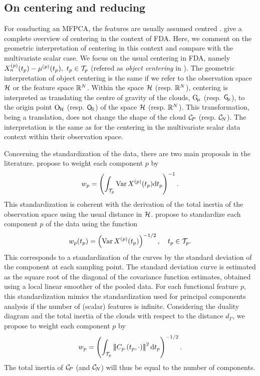 \subsection{On centering and reducing} %
\label{sub:on_centering_and_reducing}

For conducting an MFPCA, the features are usually assumed centred \citep{happMultivariateFunctionalPrincipal2018a}. \cite{protheroNewPerspectivesCentering2023} give a complete overview of centering in the context of FDA. Here, we comment on the geometric interpretation of centering in this context and compare with the multivariate scalar case. We focus on the usual centering in FDA, namely $X_n^{(p)}(t_p) - \mu^{(p)}(t_p),~t_p \in \mathcal{T}_{p}$ (refered as \emph{object centering} in \cite{protheroNewPerspectivesCentering2023}).
The geometric interpretation of object centering is the same if we refer to the observation space $\mathcal{H}$ or the feature space $\mathbb{R}^N$. Within the space $\mathcal{H}$ (resp. $\mathbb{R}^N$), centering is interpreted as translating the centre of gravity of the clouds, $\mathrm{G}_{\!\mu}$ (resp. $\mathsf{G}_{\!\mu}$), to the origin point $\mathrm{O}_{\!\mathcal{H}}$ (resp. $\mathsf{O}_{\!\mathbb{R}}$) of the space $\mathcal{H}$ (resp. $\mathbb{R}^N$). This transformation, being a translation, does not change the shape of the cloud $\mathcal{C}_{\!P}$ (resp. $\mathcal{C}_{\!N}$). The interpretation is the same as for the centering in the multivariate scalar data context within their observation space.

Concerning the standardization of the data, there are two main proposals in the literature. \cite{happMultivariateFunctionalPrincipal2018a} propose to weight each component $p$ by
\begin{equation}
w_p = \left(\int_{\mathcal{T}_{p}} \operatorname{Var} X^{(p)}(t_p) {\rm d} t_p\right)^{-1}.
\end{equation}
This standardization is coherent with the derivation of the total inertia of the observation space using the usual distance in $\mathcal{H}$. \cite{chiouMultivariateFunctionalPrincipal2014} propose to standardize each component $p$ of the data using the function
\begin{equation}
w_p(t_p) = \left(\operatorname{Var} X^{(p)}(t_p)\right)^{-1/2}, \quad t_p \in \mathcal{T}_{p}.
\end{equation}
This corresponds to a standardization of the curves by the standard deviation of the component at each sampling point. The standard deviation curve is estimated as the square root of the diagonal of the covariance function estimates, obtained using a local linear smoother of the pooled data. For each functional feature $p$, this standardization mimics the standardization used for principal components analysis if the number of (scalar) features is infinite.
Considering the duality diagram and the total inertia of the clouds with respect to the distance $d_\Gamma$, we propose to weight each component $p$ by
\begin{equation}
    w_p = \left(\int_{\mathcal{T}_{p}} \left|\!\left|\!\left|C_{p \cdot}(t_p, \cdot)\right|\!\right|\!\right|^2 {\rm d} t_p\right)^{-1/2}.
\end{equation}
The total inertia of $\mathcal{C}_{\!P}$ (and $\mathcal{C}_{\!N}$) will thus be equal to the number of components.


